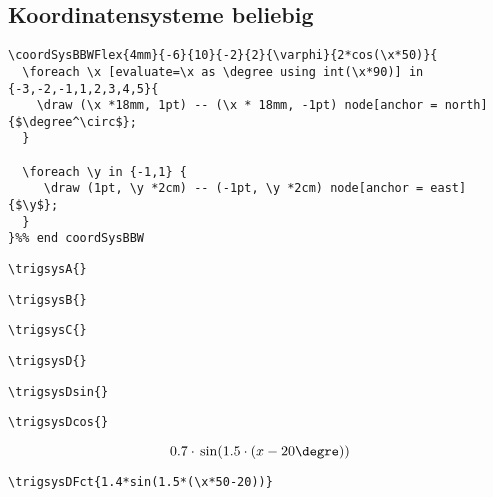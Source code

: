 \subsection{Koordinatensysteme beliebig}

\begin{verbatim}
\coordSysBBWFlex{4mm}{-6}{10}{-2}{2}{\varphi}{2*cos(\x*50)}{
  \foreach \x [evaluate=\x as \degree using int(\x*90)] in {-3,-2,-1,1,2,3,4,5}{ 
    \draw (\x *18mm, 1pt) -- (\x * 18mm, -1pt) node[anchor = north] {$\degree^\circ$};
  }
   
  \foreach \y in {-1,1} {
     \draw (1pt, \y *2cm) -- (-1pt, \y *2cm) node[anchor = east] {$\y$};
  }
}%% end coordSysBBW

\end{verbatim}

\trigsysA{}
\begin{verbatim}
\trigsysA{}
\end{verbatim}

\trigsysB{}
\begin{verbatim}
\trigsysB{}
\end{verbatim}

\trigsysC{}
\begin{verbatim}
\trigsysC{}
\end{verbatim}

\trigsysD{}
\begin{verbatim}
\trigsysD{}
\end{verbatim}

\trigsysDsin{}
\begin{verbatim}
\trigsysDsin{}
\end{verbatim}

\trigsysDcos{}
\begin{verbatim}
\trigsysDcos{}
\end{verbatim}

$$0.7\cdot{}\sin(1.5\cdot{}(x-20\degre))$$
\begin{verbatim}
\trigsysDFct{1.4*sin(1.5*(\x*50-20))}
\end{verbatim}


